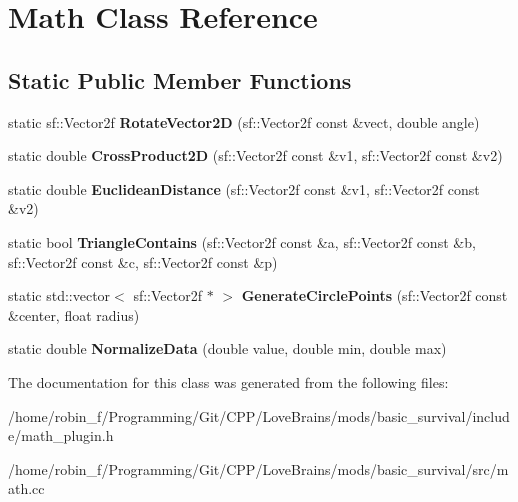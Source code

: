\section{Math Class Reference}
\label{class_math}
\subsection*{Static Public Member Functions}
\begin{DoxyCompactItemize}
\item 
static sf\+::\+Vector2f {\bfseries Rotate\+Vector2\+D} (sf\+::\+Vector2f const \&vect, double angle)\label{class_math_af9d3404798c8de16c8c3a2b26db1a6c3}

\item 
static double {\bfseries Cross\+Product2\+D} (sf\+::\+Vector2f const \&v1, sf\+::\+Vector2f const \&v2)\label{class_math_a414cd7458586d44b866c35ce4fbc2656}

\item 
static double {\bfseries Euclidean\+Distance} (sf\+::\+Vector2f const \&v1, sf\+::\+Vector2f const \&v2)\label{class_math_a6427533d062847b806e72298750307bb}

\item 
static bool {\bfseries Triangle\+Contains} (sf\+::\+Vector2f const \&a, sf\+::\+Vector2f const \&b, sf\+::\+Vector2f const \&c, sf\+::\+Vector2f const \&p)\label{class_math_a9f1ae3d23538e7e0abfa075657e583f7}

\item 
static std\+::vector$<$ sf\+::\+Vector2f $\ast$ $>$ {\bfseries Generate\+Circle\+Points} (sf\+::\+Vector2f const \&center, float radius)\label{class_math_ae30d3b026356a0d9c9611e9ca6e3ee74}

\item 
static double {\bfseries Normalize\+Data} (double value, double min, double max)\label{class_math_a8c36a62ddc41b11bf332dcb436983454}

\end{DoxyCompactItemize}


The documentation for this class was generated from the following files\+:\begin{DoxyCompactItemize}
\item 
/home/robin\+\_\+f/\+Programming/\+Git/\+C\+P\+P/\+Love\+Brains/mods/basic\+\_\+survival/include/math\+\_\+plugin.\+h\item 
/home/robin\+\_\+f/\+Programming/\+Git/\+C\+P\+P/\+Love\+Brains/mods/basic\+\_\+survival/src/math.\+cc\end{DoxyCompactItemize}
